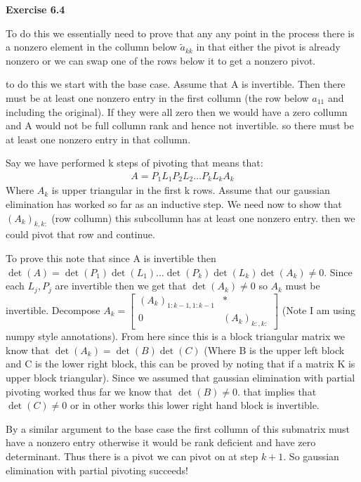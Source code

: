\documentclass[12pt]{article}
\newenvironment{exercise}[1]{\vspace{.1in}\noindent\textbf{Exercise #1 \hspace{.05em}}}{}
\theoremstyle{definition}
\theoremstyle{remark}
\begin{document}
\begin{exercise}{6.4}

	To do this we essentially need to prove that any any point in the process there is a nonzero element in the collumn below $\tilde a_{kk}$ in that either the pivot is already nonzero or we can swap one of the rows below it to get a nonzero pivot.

	to do this we start with the base case. Assume that A is invertible. Then there must be at least one nonzero entry in the first collumn (the row below $a_{11}$ and including the original). If they were all zero then we would have a zero collumn and A would not be full collumn rank and hence not invertible. so there must be at least one nonzero entry in that collumn.

	Say we have performed k steps of pivoting that means that:
	\begin{align}
		A=P_1L_1P_2L_2\dots P_kL_kA_k
	\end{align}
	Where $A_k$ is upper triangular in the first k rows. Assume that our gaussian elimination has worked so far as an inductive step. We need now to show that $(A_k)_{k,k:}$ (row collumn) this subcollumn has at least one nonzero entry. then we could pivot that row and continue.

	To prove this note that since A is invertible then $\det(A)=\det(P_1)\det(L_1)\dots \det(P_k)\det(L_k)\det(A_k)\neq 0$. Since each $L_j,P_j$ are invertible then we get that $\det(A_k)\neq 0$ so $A_k$ must be invertible. Decompose $A_k=%
		\begin{bmatrix}
			(A_{k})_{1:k-1,1:k-1} & *             \\
			0                     & (A_k)_{k:,k:}
		\end{bmatrix}$ (Note I am using numpy style annotations). From here since this is a block triangular matrix we know that $\det(A_k)=\det(B)\det(C)$ (Where B is the upper left block and C is the lower right block, this can be proved by noting that if a matrix K is upper block triangular). Since we assumed that gaussian elimination with partial pivoting worked thus far we know that $\det(B)\neq 0$. that implies that $\det(C)\neq 0$ or in other works this lower right hand block is invertible.

	By a similar argument to the base case the first collumn of this submatrix must have a nonzero entry otherwise it would be rank deficient and have zero determinant. Thus there is a pivot we can pivot on at step $k+1$. So gaussian elimination with partial pivoting succeeds!
\end{exercise}
\end{document}
